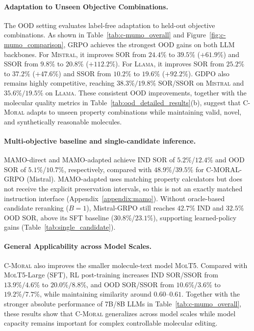 \documentclass[11pt]{article}
\begin{document}
\paragraph{Adaptation to Unseen Objective Combinations.}
The OOD setting evaluates label-free adaptation to held-out objective combinations. As shown in Table~\ref{tab:c-mumo_overall} and Figure~\ref{fig:c-mumo_comparison}, GRPO achieves the strongest OOD gains on both LLM backbones. For \textsc{Mistral}, it improves SOR from $24.4\%$ to \textbf{$39.5\%$} ($+61.9\%$) and SSOR from $9.8\%$ to \textbf{$20.8\%$} ($+112.2\%$). For \textsc{Llama}, it improves SOR from $25.2\%$ to \textbf{$37.2\%$} ($+47.6\%$) and SSOR from $10.2\%$ to \textbf{$19.6\%$} ($+92.2\%$). GDPO also remains highly competitive, reaching $38.3\%/19.8\%$ SOR/SSOR on \textsc{Mistral} and $35.6\%/19.5\%$ on \textsc{Llama}. These consistent OOD improvements, together with the molecular quality metrics in Table~\ref{tab:ood_detailed_results}(b), suggest that \textsc{C-Moral} adapts to unseen property combinations while maintaining valid, novel, and synthetically reasonable molecules.

\paragraph{Multi-objective baseline and single-candidate inference.}
MAMO-direct and MAMO-adapted achieve IND SOR of $5.2\%$/$12.4\%$ and OOD SOR of $5.1\%$/$10.7\%$, respectively, compared with $48.9\%$/$39.5\%$ for C-MORAL-GRPO (Mistral). MAMO-adapted uses matching property calculators but does not receive the explicit preservation intervals, so this is not an exactly matched instruction interface (Appendix~\ref{appendix:mamo}). Without oracle-based candidate reranking ($B=1$), Mistral-GRPO still reaches $42.7\%$ IND and $32.5\%$ OOD SOR, above its SFT baseline ($30.8\%$/$23.1\%$), supporting learned-policy gains (Table~\ref{tab:single_candidate}).

\paragraph{General Applicability across Model Scales.}
\textsc{C-Moral} also improves the smaller molecule-text model \textsc{MolT5}. Compared with \textsc{MolT5}-Large (SFT), RL post-training increases IND SOR/SSOR from $13.9\%/4.6\%$ to $20.0\%/8.8\%$, and OOD SOR/SSOR from $10.6\%/3.6\%$ to $19.2\%/7.7\%$, while maintaining similarity around $0.60$--$0.61$. Together with the stronger absolute performance of 7B/8B LLMs in Table~\ref{tab:c-mumo_overall}, these results show that \textsc{C-Moral} generalizes across model scales while model capacity remains important for complex controllable molecular editing.
\end{document}
